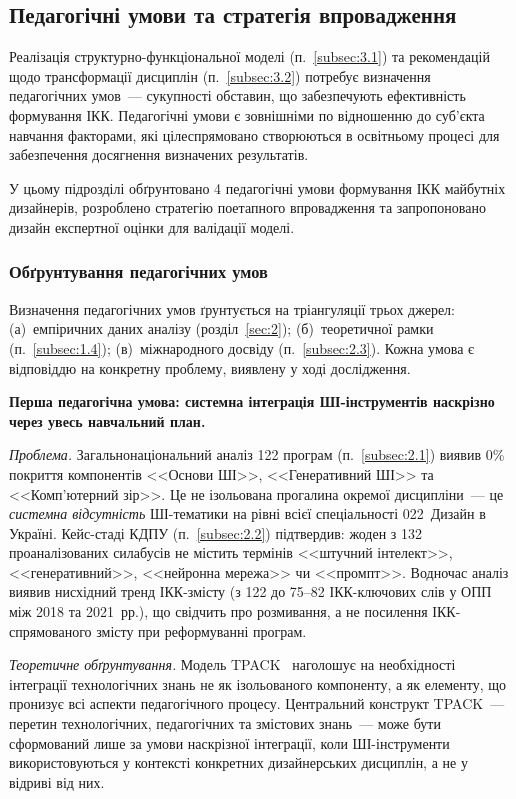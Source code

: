 \subsection{Педагогічні умови та стратегія впровадження}\label{subsec:3.3}

Реалізація структурно-функціональної моделі (п.~\ref{subsec:3.1}) та рекомендацій щодо трансформації дисциплін (п.~\ref{subsec:3.2}) потребує визначення педагогічних умов~--- сукупності обставин, що забезпечують ефективність формування ІКК. Педагогічні умови є зовнішніми по відношенню до суб'єкта навчання факторами, які цілеспрямовано створюються в освітньому процесі для забезпечення досягнення визначених результатів.

У цьому підрозділі обґрунтовано 4 педагогічні умови формування ІКК майбутніх дизайнерів, розроблено стратегію поетапного впровадження та запропоновано дизайн експертної оцінки для валідації моделі.

\subsubsection{Обґрунтування педагогічних умов}\label{sssec:3.3.1}

Визначення педагогічних умов ґрунтується на тріангуляції трьох джерел: (а)~емпіричних даних аналізу (розділ~\ref{sec:2}); (б)~теоретичної рамки (п.~\ref{subsec:1.4}); (в)~міжнародного досвіду (п.~\ref{subsec:2.3}). Кожна умова є відповіддю на конкретну проблему, виявлену у ході дослідження.

\textbf{Перша педагогічна умова: системна інтеграція ШІ-інструментів наскрізно через увесь навчальний план.}

\textit{Проблема.} Загальнонаціональний аналіз 122 програм (п.~\ref{subsec:2.1}) виявив 0\% покриття компонентів <<Основи ШІ>>, <<Генеративний ШІ>> та <<Комп'ютерний зір>>. Це не ізольована прогалина окремої дисципліни~--- це \textit{системна відсутність} ШІ-тематики на рівні всієї спеціальності 022~Дизайн в Україні. Кейс-стаді КДПУ (п.~\ref{subsec:2.2}) підтвердив: жоден з 132 проаналізованих силабусів не містить термінів <<штучний інтелект>>, <<генеративний>>, <<нейронна мережа>> чи <<промпт>>. Водночас аналіз виявив нисхідний тренд ІКК-змісту (з 122 до 75--82 ІКК-ключових слів у ОПП між 2018 та 2021~рр.), що свідчить про розмивання, а не посилення ІКК-спрямованого змісту при реформуванні програм.

\textit{Теоретичне обґрунтування.} Модель TPACK~\cite{Mishra2006} наголошує на необхідності інтеграції технологічних знань не як ізольованого компоненту, а як елементу, що пронизує всі аспекти педагогічного процесу. Центральний конструкт TPACK~--- перетин технологічних, педагогічних та змістових знань~--- може бути сформований лише за умови наскрізної інтеграції, коли ШІ-інструменти використовуються у контексті конкретних дизайнерських дисциплін, а не у відриві від них.

